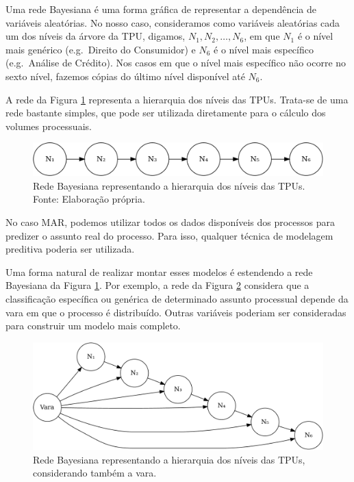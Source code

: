 \documentclass[]{report}
\begin{document}
Uma rede Bayesiana é uma forma gráfica de representar a dependência de
variáveis aleatórias. No nosso caso, consideramos como variáveis
aleatórias cada um dos níveis da árvore da TPU, digamos,
\(N_1, N_2, \dots, N_6\), em que \(N_1\) é o nível mais genérico
(e.g.~Direito do Consumidor) e \(N_6\) é o nível mais específico
(e.g.~Análise de Crédito). Nos casos em que o nível mais específico não
ocorre no sexto nível, fazemos cópias do último nível disponível até
\(N_6\).

A rede da Figura \ref{fig:rb} representa a hierarquia dos níveis das
TPUs. Trata-se de uma rede bastante simples, que pode ser utilizada
diretamente para o cálculo dos volumes processuais.

\begin{figure}[htbp]
\centering
\includegraphics{imgs/08-metodologia_files/figure-latex/rb-1.pdf}
\caption{Rede Bayesiana representando a hierarquia dos níveis das TPUs.
Fonte: Elaboração própria.}\label{fig:rb}
\end{figure}

No caso MAR, podemos utilizar todos os dados disponíveis dos processos
para predizer o assunto real do processo. Para isso, qualquer técnica de
modelagem preditiva poderia ser utilizada.

Uma forma natural de realizar montar esses modelos é estendendo a rede
Bayesiana da Figura \ref{fig:rb}. Por exemplo, a rede da Figura
\ref{fig:rb2} considera que a classificação específica ou genérica de
determinado assunto processual depende da vara em que o processo é
distribuído. Outras variáveis poderiam ser consideradas para construir
um modelo mais completo.

\begin{figure}[htbp]
\centering
\includegraphics{imgs/08-metodologia_files/figure-latex/rb2-1.pdf}
\caption{Rede Bayesiana representando a hierarquia dos níveis das TPUs,
considerando também a vara.}\label{fig:rb2}
\end{figure}
\end{document}
